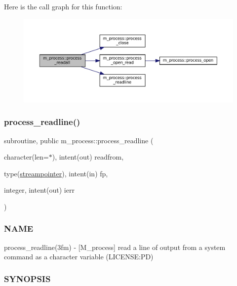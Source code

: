 Here is the call graph for this function\+:\nopagebreak
\begin{figure}[H]
\begin{center}
\leavevmode
\includegraphics[width=350pt]{namespacem__process_a7dd759a1344789477ae1e205d7fa9a51_cgraph}
\end{center}
\end{figure}
\mbox{\label{namespacem__process_acbc72c5ed371430a471aa1f3010fbbda}} 
\subsubsection{\texorpdfstring{process\+\_\+readline()}{process\_readline()}}
{\footnotesize\ttfamily subroutine, public m\+\_\+process\+::process\+\_\+readline (\begin{DoxyParamCaption}\item[{character(len=$\ast$), intent(out)}]{readfrom,  }\item[{type(\mbox{\hyperlink{structm__process_1_1streampointer}{streampointer}}), intent(in)}]{fp,  }\item[{integer, intent(out)}]{ierr }\end{DoxyParamCaption})}



\subsubsection*{N\+A\+ME}

process\+\_\+readline(3fm) -\/ \mbox{[}M\+\_\+process\mbox{]} read a line of output from a system command as a character variable (L\+I\+C\+E\+N\+SE\+:PD) 

\subsubsection*{S\+Y\+N\+O\+P\+S\+IS}

